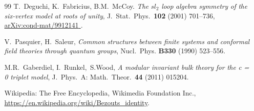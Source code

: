 \documentclass[11pt]{article}
\numberwithin{equation}{section}
\theoremstyle{definition}
\numberwithin{equation}{section}
\def\arxiv#1#2{\href{http://arxiv.org/abs/#1}{\textsf{arXiv:#1 #2}}}
\begin{document}
\begin{thebibliography}{99}
	T.~Deguchi, K.~Fabricius, B.M.~McCoy.
	{\em The $sl_2$ loop algebra symmetry of the six-vertex model at roots of unity},
	J.~Stat.~Phys.~{\bf 102} (2001) 701--736,
	\arxiv{cond-mat/9912141}{\!\!}.
	
	V.~Pasquier, H.~Saleur, 
	{\em Common structures between finite systems and conformal field theories through quantum groups}, 
	Nucl.~Phys. {\bf B330} (1990) 523--556.	
	
	M.R.~Gaberdiel, I.~Runkel,~S.Wood, 
	{\em A modular invariant bulk theory for the c = 0 triplet model},
	J.~Phys.~A: Math.~Theor.~{\bf 44} (2011) 015204.
		
	Wikipedia: The Free Encyclopedia, Wikimedia Foundation Inc.,\\
	\url{https://en.wikipedia.org/wiki/Bezouts_identity}.				

\end{thebibliography}
\end{document}
